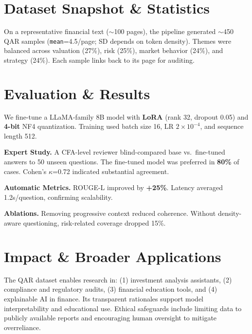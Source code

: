 \documentclass[sigconf,authordraft,anonymous]{acmart}
\begin{document}
\section{Dataset Snapshot \& Statistics}
On a representative financial text ($\sim$100 pages), the pipeline generated $\sim$450 QAR samples (\texttt{mean}=4.5/page; SD depends on token density). Themes were balanced across valuation (27\%), risk (25\%), market behavior (24\%), and strategy (24\%). Each sample links back to its page for auditing.

\section{Evaluation \& Results}
We fine-tune a LLaMA-family 8B model with \textbf{LoRA} (rank 32, dropout 0.05) and \textbf{4-bit} NF4 quantization. Training used batch size 16, LR $2\!\times\!10^{-4}$, and sequence length 512.

\textbf{Expert Study.} A CFA-level reviewer blind-compared base vs.\ fine-tuned answers to 50 unseen questions. The fine-tuned model was preferred in \textbf{80\%} of cases. Cohen’s $\kappa$=0.72 indicated substantial agreement.

\textbf{Automatic Metrics.} ROUGE-L improved by \textbf{+25\%}. Latency averaged 1.2s/question, confirming scalability.

\textbf{Ablations.} Removing progressive context reduced coherence. Without density-aware questioning, risk-related coverage dropped 15\%.

\section{Impact \& Broader Applications}
The QAR dataset enables research in: (1) investment analysis assistants, (2) compliance and regulatory audits, (3) financial education tools, and (4) explainable AI in finance. Its transparent rationales support model interpretability and educational use. Ethical safeguards include limiting data to publicly available reports and encouraging human oversight to mitigate overreliance. 







\appendix
\end{document}
